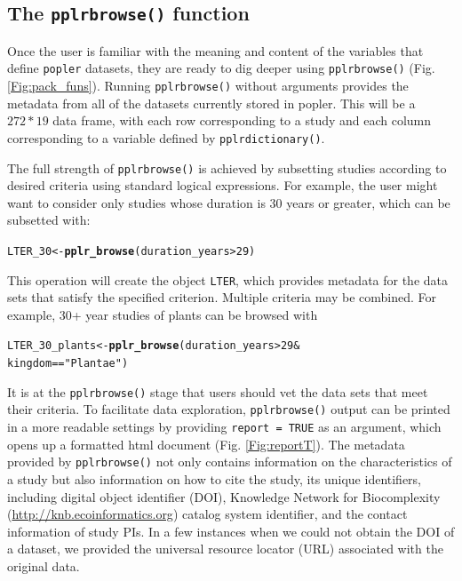 \documentclass{article}\usepackage[]{graphicx}\usepackage[]{color}
\makeatletter
\newcommand{\hlnum}[1]{\textcolor[rgb]{0.686,0.059,0.569}{#1}}%
\newcommand{\hlstr}[1]{\textcolor[rgb]{0.192,0.494,0.8}{#1}}%
\newcommand{\hlopt}[1]{\textcolor[rgb]{0,0,0}{#1}}%
\newcommand{\hlstd}[1]{\textcolor[rgb]{0.345,0.345,0.345}{#1}}%
\newcommand{\hlkwb}[1]{\textcolor[rgb]{0.69,0.353,0.396}{#1}}%
\newcommand{\hlkwd}[1]{\textcolor[rgb]{0.737,0.353,0.396}{\textbf{#1}}}%
\newenvironment{kframe}{%
 \def\at@end@of@kframe{}%
 \ifinner\ifhmode%
  \def\at@end@of@kframe{\end{minipage}}%
  \begin{minipage}{\columnwidth}%
 \fi\fi%
 \def\FrameCommand##1{\hskip\@totalleftmargin \hskip-\fboxsep
 \colorbox{shadecolor}{##1}\hskip-\fboxsep
     \hskip-\linewidth \hskip-\@totalleftmargin \hskip\columnwidth}%
 \MakeFramed {\advance\hsize-\width
   \@totalleftmargin\z@ \linewidth\hsize
   \@setminipage}}%
 {\par\unskip\endMakeFramed%
 \at@end@of@kframe}
\newenvironment{knitrout}{}{} %
\makeatother
\begin{document}
\subsection*{The \texttt{pplr\textunderscore browse()} function}
Once the user is familiar with the meaning and content of the variables that define \texttt{popler} datasets, they are ready to dig deeper using \texttt{pplr\textunderscore browse()} (Fig. \ref{Fig:pack_funs}). Running \texttt{pplr\textunderscore browse()} without arguments provides the metadata from all of the datasets currently stored in popler. This will be a $272 * 19$ data frame, with each row corresponding to a study and each column corresponding to a variable defined by \texttt{pplr\textunderscore dictionary()}.

The full strength of \texttt{pplr\textunderscore browse()} is achieved by subsetting studies according to desired criteria using standard logical expressions. For example, the user might want to consider only studies whose duration is 30 years or greater, which can be subsetted with:
\begin{knitrout}
\color{fgcolor}\begin{kframe}
\begin{alltt}
\hlstd{LTER_30} \hlkwb{<-} \hlkwd{pplr_browse}\hlstd{( duration_years} \hlopt{>} \hlnum{29}\hlstd{)}
\end{alltt}
\end{kframe}
\end{knitrout}
This operation will create the object \texttt{LTER}, which provides metadata for the data sets that satisfy the specified criterion. Multiple criteria may be combined. For example, 30+ year studies of plants can be browsed with
\begin{knitrout}
\color{fgcolor}\begin{kframe}
\begin{alltt}
\hlstd{LTER_30_plants} \hlkwb{<-} \hlkwd{pplr_browse}\hlstd{( duration_years} \hlopt{>} \hlnum{29} \hlopt{&}
                               \hlstd{kingdom} \hlopt{==} \hlstr{"Plantae"}\hlstd{)}
\end{alltt}
\end{kframe}
\end{knitrout}
It is at the \texttt{pplr\textunderscore browse()} stage that users should  vet the data sets that meet their criteria. To facilitate data exploration, \texttt{pplr\textunderscore browse()} output can be printed in a more readable settings by providing \texttt{report = TRUE} as an argument, which opens up a formatted html document (Fig. \ref{Fig:reportT}). The metadata provided by \texttt{pplr\textunderscore browse()} not only contains information on the characteristics of a study but also information on how to cite the study, its unique identifiers, including digital object identifier (DOI), Knowledge Network for Biocomplexity (\url{http://knb.ecoinformatics.org}) catalog system identifier, and the contact information of study PIs. In a few instances when we could not obtain the DOI of a dataset, we provided the universal resource locator (URL) associated with the original data.
\end{document}
